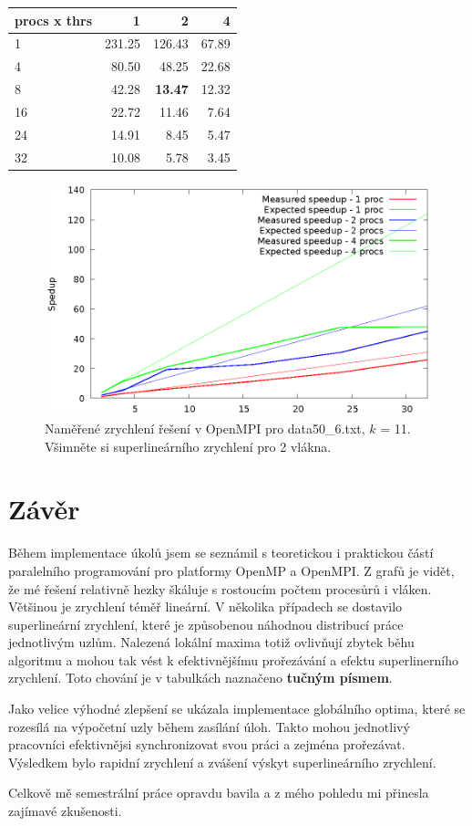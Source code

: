 \documentclass{article}
\begin{document}
\begin{center}
	\begin{tabular}{l|rrr}
		procs x thrs	& 1 & 2 & 4 \\
		\hline
		1 & 231.25 & 126.43 & 67.89 \\
		4 & 80.50 & 48.25 & 22.68 \\
		8 & 42.28 & \textbf{13.47} & 12.32 \\
		16 & 22.72 & 11.46 & 7.64 \\
		24 & 14.91 & 8.45 & 5.47 \\
		32 & 10.08 & 5.78 & 3.45 \\
	\end{tabular} 
	\label{table:parallel6}
		\begin{figure}[H]
		\centering
		\includegraphics{mpi_speedup_11_graph50_6.eps}
		\caption{Naměřené zrychlení řešení v OpenMPI pro data50\_6.txt, $k$ = 11. Všimněte si superlineárního zrychlení pro 2 vlákna.}%
	\end{figure}
\end{center}

\section{Závěr}
Během implementace úkolů jsem se seznámil s teoretickou i praktickou částí paralelního programování pro platformy OpenMP a OpenMPI. Z grafů je vidět, že mé řešení relativně hezky škáluje s rostoucím počtem procesůrů i vláken. Většinou je zrychlení téměř lineární. V několika případech se dostavilo superlineární zrychlení, které je způsobenou náhodnou distribucí práce jednotlivým uzlům. Nalezená lokální maxima totiž ovlivňují zbytek běhu algoritmu a mohou tak vést k efektivnějšímu prořezávání a efektu superlinerního zrychlení. Toto chování je v tabulkách naznačeno \textbf{tučným písmem}.

Jako velice výhodné zlepšení se ukázala implementace globálního optima, které se rozesílá na výpočetní uzly během zasílání úloh. Takto mohou jednotlivý pracovníci efektivnějsi synchronizovat svou práci a zejména prořezávat. Výsledkem bylo rapidní zrychlení a zvášení výskyt superlineárního zrychlení.

Celkově mě semestrální práce opravdu bavila a z mého pohledu mi přinesla zajímavé zkušenosti.
\end{document}
